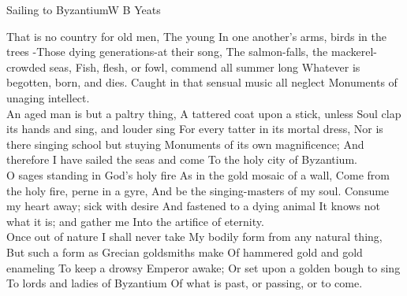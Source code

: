 \begin{poem}{Sailing to Byzantium}{W B Yeats}

That is no country for old men, The young
In one another's arms, birds in the trees
-Those dying generations-at their song,
The salmon-falls, the mackerel-crowded seas,
Fish, flesh, or fowl, commend all summer long
Whatever is begotten, born, and dies.
Caught in that sensual music all neglect
Monuments of unaging intellect.\\

An aged man is but a paltry thing,
A tattered coat upon a stick, unless
Soul clap its hands and sing, and louder sing
For every tatter in its mortal dress,
Nor is there singing school but stuying 
Monuments of its own magnificence;
And therefore I have sailed the seas and come
To the holy city of Byzantium.\\

O sages standing in God's holy fire
As in the gold mosaic of a wall,
Come from the holy fire, perne in a gyre,
And be the singing-masters of my soul.
Consume my heart away; sick with desire
And fastened to a dying animal
It knows not what it is; and gather me
Into the artifice of eternity.\\

Once out of nature I shall never take
My bodily form from any natural thing,
But such a form as Grecian goldsmiths make
Of hammered gold and gold enameling
To keep a drowsy Emperor awake;
Or set upon a golden bough to sing
To lords and ladies of Byzantium
Of what is past, or passing, or to come.\\
\end{poem}

 

